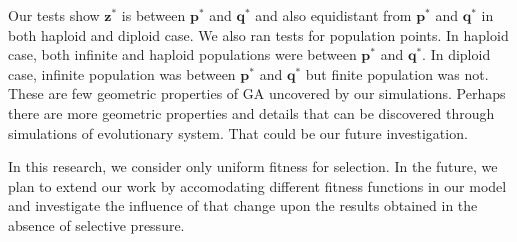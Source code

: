 Our tests show $\bm{z}^\ast$ is between $\bm{p}^\ast$ and $\bm{q}^\ast$ 
and also equidistant from $\bm{p}^\ast$ and $\bm{q}^\ast$ in both haploid and diploid case. 
We also ran tests for population points. In haploid case, 
both infinite and haploid populations were between $\bm{p}^\ast$ and $\bm{q}^\ast$. 
In diploid case, infinite population was between $\bm{p}^\ast$ and $\bm{q}^\ast$ but finite population was not. 
These are few geometric properties of GA uncovered by our simulations. 
Perhaps there are more geometric properties and details that can be discovered through simulations of evolutionary system.
That could be our future investigation.

In this research, we consider only uniform fitness for selection.  
In the future, we plan to extend our work by accomodating different fitness functions in our model and investigate 
the influence of that change upon the results obtained in the absence of selective pressure.



